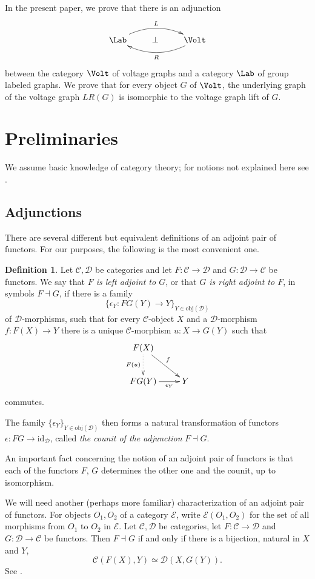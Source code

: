 \documentclass{amsart}
\theoremstyle{definition}
\newtheorem{definition}[theorem]{Definition}
\newcommand{\id}{\mathrm{id}}
\newcommand{\obj}{\mathrm{obj}}
\newcommand{\C}{\mathcal{C}}
\newcommand{\D}{\mathcal{D}}
\newcommand{\isleftadjoint}{\dashv}
\begin{document}
In the present paper, we prove that there is an adjunction
$$
\xymatrix{
\Lab
	\ar@/^1.2pc/[rr]^-L
&
\bot
&
\Volt
	\ar@/^1.2pc/[ll]^-R
}
$$
between the category  $\Volt$ of voltage graphs and a
category $\Lab$ of group labeled graphs. 
We prove that for every object $G$ of $\Volt$, the underlying graph of the voltage graph
$LR(G)$ is isomorphic to the voltage graph lift of $G$.

\section{Preliminaries}

We assume basic knowledge of category theory; for notions not explained here see
\cite{mac1998categories,riehl2016category}.

\subsection{Adjunctions}

There are several different but equivalent definitions of an adjoint
pair of functors. For our purposes, the following is the most convenient one.
\begin{definition}\cite[(ii) of Theorem IV.1]{mac1998categories}
Let $\C,\D$ be categories and let $F\colon\C\to\D$ and
$G\colon\D\to\C$ be functors. We say that {\em $F$ is left adjoint to $G$},
or that {\em $G$ is right adjoint to $F$}, in symbols $F\isleftadjoint G$, 
if there is a family 
$$
\{\epsilon_Y\colon FG(Y)\to Y\}_{Y\in\obj(\D)}
$$ of $\D$-morphisms,
such that for every $\C$-object $X$ and a $\D$-morphism $f\colon F(X)\to Y$
there is a unique $\C$-morphism $u\colon X\to G(Y)$ such that 
\begin{equation*}
\xymatrix{
F(X)
	\ar[rd]^{f}
	\ar@{.>}[d]_{F(u)}
\\
FG(Y)
	\ar[r]_-{\epsilon_Y}
&
Y
}
\end{equation*}
commutes.
\end{definition}

The family $\{\epsilon_Y\}_{Y\in\obj(\D)}$ then forms a natural transformation of functors 
$\epsilon\colon FG\to\id_{\D}$, called {\em the counit of the adjunction} $F\isleftadjoint G$.

An important fact concerning the notion of an adjoint pair of functors is that each of the functors
$F$, $G$ determines the other one and the counit, up to isomorphism.

We will need another (perhaps more familiar) characterization of an adjoint pair of
functors. For objects $O_1,O_2$ of a category $\mathcal E$, write $\mathcal E(O_1,O_2)$ for the
set of all morphisms from $O_1$ to $O_2$ in $\mathcal E$.
Let $\C,\D$ be categories, let $F\colon\C\to\D$ and
$G\colon\D\to\C$ be functors. Then $F\isleftadjoint G$ if and only if there is
a bijection, natural in $X$ and $Y$,
\[
\C(F(X),Y)\simeq \D(X,G(Y)).
\]
See \cite[section IV.1]{mac1998categories}.
\end{document}
